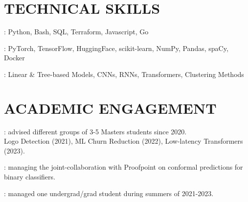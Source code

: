 \documentclass[resmargin]{resume_style_class} %
\newenvironment{outline-cond}
  {\begin{list}{}{
  \setlength{\leftmargin}{30pt}
  \setlength\topsep{-10pt}
  \setlength\itemindent{-30pt}
  }}
  {\end{list}}
\begin{document}
\begin{resume}
\section{TECHNICAL SKILLS}
\begin{outline-cond} 
	\item {}: Python, Bash, SQL, Terraform, Javascript, Go
	\item {}: PyTorch, TensorFlow, HuggingFace, scikit-learn, NumPy, Pandas, spaCy, Docker
	\item {}: Linear \& Tree-based Models, CNNs, RNNs, Transformers, Clustering Methods
\end{outline-cond} 


\section{ACADEMIC ENGAGEMENT}
\begin{outline-cond} 
	\item {}: advised different groups of 3-5 Masters students since 2020. \\Logo Detection (2021), ML Churn Reduction (2022), Low-latency Transformers (2023).
	\item {}: managing the joint-collaboration with Proofpoint on conformal predictions for binary classifiers.
	\item {}: managed one undergrad/grad student during summers of 2021-2023.
\end{outline-cond} 






\end{resume}
\end{document}
